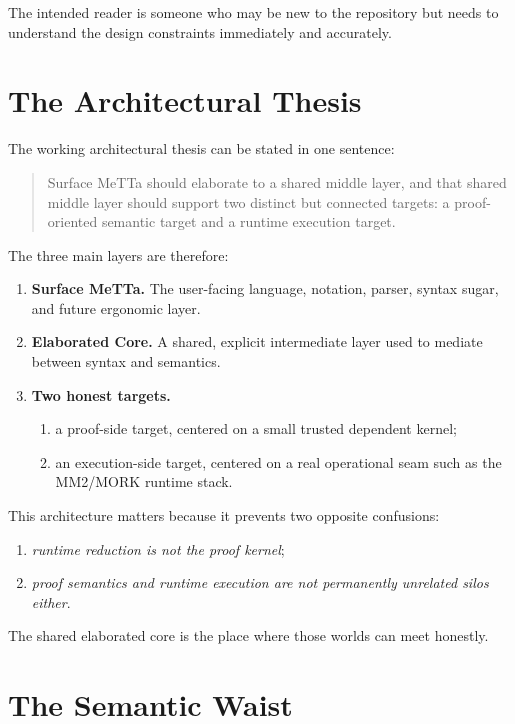 \documentclass[11pt]{article}
\newcommand{\MeTTa}{\textup{MeTTa}}
\newcommand{\MORK}{\textup{MORK}}
\newcommand{\MMTwo}{\textup{MM2}}
\begin{document}
The intended reader is someone who may be new to the repository but needs to
understand the design constraints immediately and accurately.

\section{The Architectural Thesis}

The working architectural thesis can be stated in one sentence:

\begin{quote}
Surface \MeTTa{} should elaborate to a shared middle layer, and that shared
middle layer should support two distinct but connected targets: a proof-oriented
semantic target and a runtime execution target.
\end{quote}

The three main layers are therefore:
\begin{enumerate}[leftmargin=2em]
  \item \textbf{Surface \MeTTa.} The user-facing language, notation, parser,
  syntax sugar, and future ergonomic layer.
  \item \textbf{Elaborated Core.} A shared, explicit intermediate layer used to
  mediate between syntax and semantics.
  \item \textbf{Two honest targets.}
  \begin{enumerate}[label=\alph*.,leftmargin=2em]
    \item a proof-side target, centered on a small trusted dependent kernel;
    \item an execution-side target, centered on a real operational seam such as
    the \MMTwo{}/\MORK{} runtime stack.
  \end{enumerate}
\end{enumerate}

This architecture matters because it prevents two opposite confusions:
\begin{enumerate}[leftmargin=2em]
  \item \emph{runtime reduction is not the proof kernel};
  \item \emph{proof semantics and runtime execution are not permanently
  unrelated silos either}.
\end{enumerate}

The shared elaborated core is the place where those worlds can meet honestly.

\section{The Semantic Waist}
\end{document}
